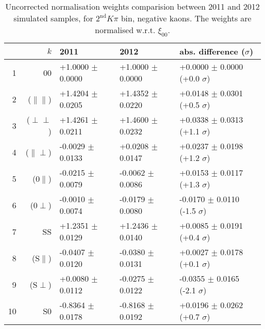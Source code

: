 \begin{table}[hbtp]
  \caption{\small Uncorrected normalisation weights comparision between 2011 and 2012 simulated samples, for $2^{\text{nd}}K\pi$ bin, negative kaons. The weights are normalised w.r.t. $\xi_{00}$.}
  \center\footnotesize
  \begin{tabular}{r r l l l}
  \multicolumn{2}{r}{$k$}             & 2011             & 2012              &   abs. difference ($\sigma$)        \\
   \hline 
  1  &  00                     & +1.0000 $\pm$  0.0000  &  +1.0000 $\pm$  0.0000  &  +0.0000 $\pm$  0.0000 (+0.0 $\sigma$) \\
  2  &  ($\parallel\parallel$) & +1.4204 $\pm$  0.0205  &  +1.4352 $\pm$  0.0220  &  +0.0148 $\pm$  0.0301 (+0.5 $\sigma$) \\
  3  &  ($\perp\perp$)         & +1.4261 $\pm$  0.0211  &  +1.4600 $\pm$  0.0232  &  +0.0338 $\pm$  0.0313 (+1.1 $\sigma$) \\
  4  &  ($\parallel\perp$)     & -0.0029 $\pm$  0.0133  &  +0.0208 $\pm$  0.0147  &  +0.0237 $\pm$  0.0198 (+1.2 $\sigma$) \\
  5  &  ($0\parallel$)         & -0.0215 $\pm$  0.0079  &  -0.0062 $\pm$  0.0086  &  +0.0153 $\pm$  0.0117 (+1.3 $\sigma$) \\
  6  &  ($0\perp$)             & -0.0010 $\pm$  0.0074  &  -0.0179 $\pm$  0.0080  &  -0.0170 $\pm$  0.0110 (-1.5 $\sigma$) \\
  7  &  SS                     & +1.2351 $\pm$  0.0129  &  +1.2436 $\pm$  0.0140  &  +0.0085 $\pm$  0.0191 (+0.4 $\sigma$) \\
  8  &  (S$\parallel$)         & -0.0407 $\pm$  0.0120  &  -0.0380 $\pm$  0.0131  &  +0.0027 $\pm$  0.0178 (+0.1 $\sigma$) \\
  9  &  (S$\perp$)             & +0.0080 $\pm$  0.0112  &  -0.0275 $\pm$  0.0122  &  -0.0355 $\pm$  0.0165 (-2.1 $\sigma$) \\
  10 &  S0                     & -0.8364 $\pm$  0.0178  &  -0.8168 $\pm$  0.0192  &  +0.0196 $\pm$  0.0262 (+0.7 $\sigma$) \\
\hline
\end{tabular}
\end{table}
